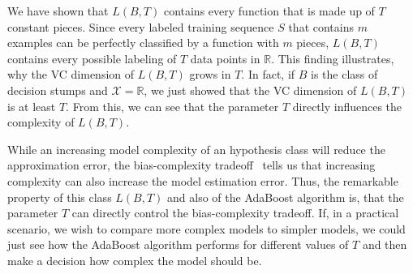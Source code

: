 We have shown that $L(B, T)$ contains every function that is made up of $T$ constant pieces. Since every labeled
training sequence $S$ that contains $m$ examples can be perfectly classified by a function with $m$ pieces,
$L(B, T)$ contains every possible labeling of $T$ data points in $\mathbb{R}$.
This finding illustrates, why the VC dimension of
$L(B, T)$ grows in $T$. In fact, if $B$ is the class of decision stumps and $\mathcal{X} = \mathbb{R}$,
we just showed that the VC dimension of $L(B, T)$ is at least $T$.
From this, we can see that the parameter $T$ directly influences the complexity of $L(B, T)$.

While an increasing model complexity of an hypothesis class will reduce the approximation error, the bias-complexity
tradeoff~\cite{SSBD14} tells us that increasing complexity can also increase the model estimation error.
Thus, the remarkable property of this class $L(B, T)$ and also of the AdaBoost algorithm is, that the parameter
$T$ can directly control the bias-complexity tradeoff.
If, in a practical scenario, we wish to compare more complex models to simpler models, we could just see how the
AdaBoost algorithm performs for different values of $T$ and then make a decision how complex the model should be.
